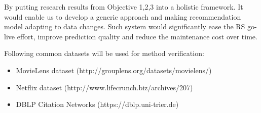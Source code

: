 By putting research results from Objective 1,2,3 into a holistic framework. It would enable us to develop a generic approach and making recommendation model adapting to data changes. Such system would significantly ease the RS go-live effort, improve prediction quality and reduce the maintenance cost over time. 

Following common datasets will be used for method verification: 

\begin{itemize}

\item MovieLens dataset (http://grouplens.org/datasets/movielens/) 

\item Netflix dataset (http://www.lifecrunch.biz/archives/207) 

\item DBLP Citation Networks (https://dblp.uni-trier.de)  

\end{itemize}